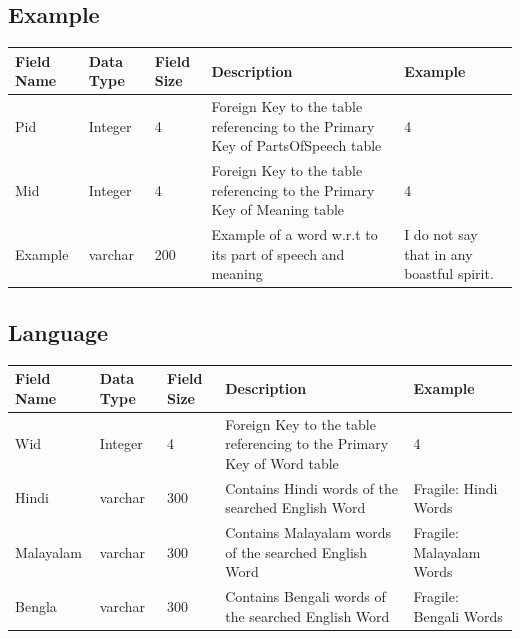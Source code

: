 \documentclass{article}
\begin{document}
\subsection*{Example}
\begin{center}
\begin{tabular}{ |m{3em}|m{3em}|m{2em}|m{5cm}|m{2.2cm}| } 
 \hline
\large\textbf{Field Name} & \large\textbf{Data Type} & \large\textbf{Field Size} & \large\textbf{Description} & \large\textbf{Example}\\  
 \hline
\small Pid & \small Integer &\small 4 &\small Foreign Key to the table referencing to the Primary Key of PartsOfSpeech table &\small 4 \\
\hline
\small Mid & \small Integer &\small 4 &\small Foreign Key to the table referencing to the Primary Key of Meaning table &\small 4 \\
\hline
\small Example & \small varchar &\small 200 &\small Example of a word w.r.t to its part of speech and meaning &\small I do not say that in any boastful spirit. \\
\hline
\end{tabular}
\end{center}

\pagebreak

\subsection*{Language}
\begin{center}
\begin{tabular}{ |m{3em}|m{2em}|m{2em}|m{3.8cm}|m{4cm}| } 
 \hline
\large\textbf{Field Name} & \large\textbf{Data Type} & \large\textbf{Field Size} & \large\textbf{Description} & \large\textbf{Example}\\  
 \hline
\small Wid & \small Integer &\small 4 &\small Foreign Key to the table referencing to the Primary Key of Word table &\small 4 \\
\hline

\small Hindi & \small varchar &\small 300 &\small Contains Hindi words of the searched English Word &\small Fragile: Hindi Words \\
\hline
\small Malayalam & \small varchar &\small 300 &\small Contains Malayalam words of the searched English Word &\small Fragile: Malayalam Words \\
\hline
\small Bengla & \small varchar &\small 300 &\small Contains Bengali words of the searched English Word &\small Fragile: Bengali Words \\
\hline
\end{tabular}
\end{center}
\end{document}
